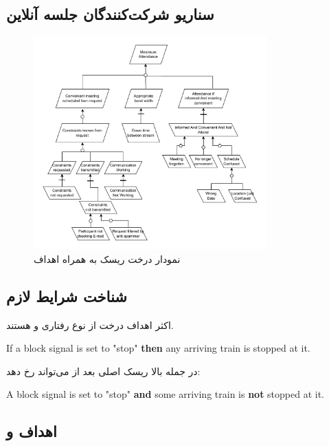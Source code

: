 \subsection{سناریو شرکت‌کنندگان جلسه آنلاین}

\begin{figure}[H]
    \centering
    \includegraphics[width=0.8\textwidth]{assets/online_attendance.drawio.pdf}
    \caption{نمودار درخت ریسک به همراه اهداف}
\end{figure}

\subsection{شناخت شرایط لازم}

اکثر اهداف درخت از نوع رفتاری  و  هستند.

\begin{LTR}
    If a block signal is set to "stop" \textbf{then} any arriving train is
    stopped at it.
\end{LTR}

در جمله بالا ریسک اصلی بعد از \textbf{} می‌تواند رخ دهد:

\begin{LTR}
    A block signal is set to "stop" \textbf{and} some arriving train is
    \textbf{not} stopped at it.
\end{LTR}

\subsection{اهداف  و }

